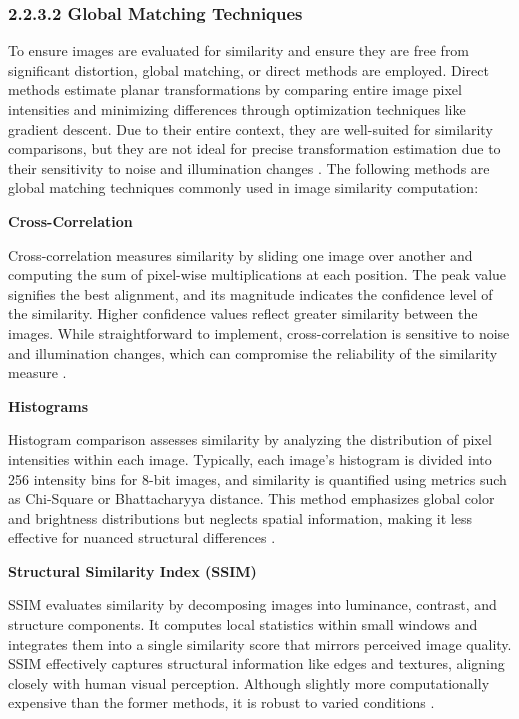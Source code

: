 \subsubsection{2.2.3.2 Global Matching Techniques}

To ensure images are evaluated for similarity and ensure they are free from significant distortion, global matching, or direct methods are employed. Direct methods estimate planar transformations by comparing entire image pixel intensities and minimizing differences through optimization techniques like gradient descent. Due to their entire context, they are well-suited for similarity comparisons, but they are not ideal for precise transformation estimation due to their sensitivity to noise and illumination changes \cite{GlobalLocal2023}. The following methods are global matching techniques commonly used in image similarity computation:


\textbf{Cross-Correlation}

Cross-correlation measures similarity by sliding one image over another and computing the sum of pixel-wise multiplications at each position. The peak value signifies the best alignment, and its magnitude indicates the confidence level of the similarity. Higher confidence values reflect greater similarity between the images. While straightforward to implement, cross-correlation is sensitive to noise and illumination changes, which can compromise the reliability of the similarity measure \cite{sharma2022crosscorrelation}.

\textbf{Histograms}

Histogram comparison assesses similarity by analyzing the distribution of pixel intensities within each image. Typically, each image's histogram is divided into 256 intensity bins for 8-bit images, and similarity is quantified using metrics such as Chi-Square or Bhattacharyya distance. This method emphasizes global color and brightness distributions but neglects spatial information, making it less effective for nuanced structural differences \cite{rosebrock2014comparehistograms}.

\textbf{Structural Similarity Index (SSIM)}

SSIM evaluates similarity by decomposing images into luminance, contrast, and structure components. It computes local statistics within small windows and integrates them into a single similarity score that mirrors perceived image quality. SSIM effectively captures structural information like edges and textures, aligning closely with human visual perception. Although slightly more computationally expensive than the former methods, it is robust to varied conditions \cite{rosebrock2017imagedifference}. 


